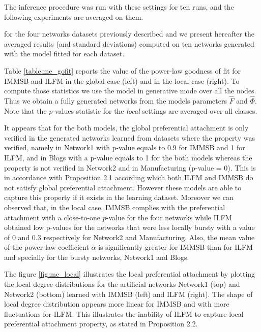 The inference procedure was run with these settings for ten runs, and the following experiments are averaged on them.

for the four networks datasets previously described and we present hereafter the averaged results (and standard deviations) computed on ten networks generated with the model fitted for each dataset.

Table \ref{table:me_gofit} reports the value of the power-law goodness of fit for IMMSB and ILFM in the global case (left) and in the local case (right). To compute those statistics we use the model in generative mode over all the nodes. Thus we obtain a fully generated networks from the models parameters $\hat F$ and $\hat \Phi$. Note that the $p$-values statistic for the \emph{local} settings are averaged over all classes.

It appears that for the both models, the global preferential attachment is only verified in the generated networks learned from datasets where the property was verified, namely in Network1 with p-value equals to 0.9 for IMMSB and 1 for ILFM, and in Blogs with a p-value equals to 1 for the both models whereas the property is not verified in Network2 and in Manufacturing (p-value = 0). This is in accordance with Proposition 2.1  according which both ILFM and IMMSB do not satisfy global preferential attachment. However these models are able to capture this property if it exists in the learning dataset.  Moreover we can observed that, in the local case, IMMSB complies with the preferential attachment with a close-to-one $p$-value for the four networks while ILFM obtained low p-values for the networks that were less locally bursty with a value of 0 and 0.3 respectively for Network2 and Manufacturing. Also, the mean value of the power-law coefficient $\alpha$ is significantly greater for IMMSB than for ILFM and specially for the bursty networks, Network1 and Blogs.

The figure \ref{fig:me_local} illustrates the local preferential attachment by plotting the local degree distributions for the artificial networks Network1 (top) and Network2 (bottom) learned with IMMSB (left) and ILFM (right). The shape of local degree distribution appears more linear for IMMSB and with more fluctuations for ILFM. This illustrates the inability  of ILFM to capture local preferential attachment property,  as stated in Proposition 2.2. 
 

